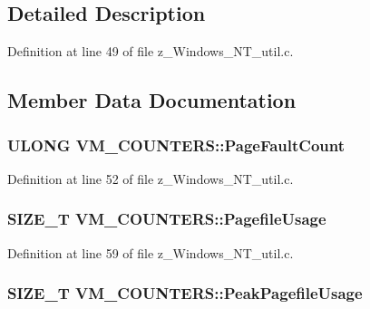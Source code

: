 \subsection{Detailed Description}


Definition at line 49 of file z\-\_\-\-Windows\-\_\-\-N\-T\-\_\-util.\-c.



\subsection{Member Data Documentation}
\hypertarget{structVM__COUNTERS_a2cc46c0341e51f5fd53025bdf0e5658c}{
\subsubsection[{Page\-Fault\-Count}]{\setlength{\rightskip}{0pt plus 5cm}U\-L\-O\-N\-G V\-M\-\_\-\-C\-O\-U\-N\-T\-E\-R\-S\-::\-Page\-Fault\-Count}}\label{structVM__COUNTERS_a2cc46c0341e51f5fd53025bdf0e5658c}


Definition at line 52 of file z\-\_\-\-Windows\-\_\-\-N\-T\-\_\-util.\-c.

\hypertarget{structVM__COUNTERS_a1ae3e46e1816321cadd686716c301e8a}{
\subsubsection[{Pagefile\-Usage}]{\setlength{\rightskip}{0pt plus 5cm}S\-I\-Z\-E\-\_\-\-T V\-M\-\_\-\-C\-O\-U\-N\-T\-E\-R\-S\-::\-Pagefile\-Usage}}\label{structVM__COUNTERS_a1ae3e46e1816321cadd686716c301e8a}


Definition at line 59 of file z\-\_\-\-Windows\-\_\-\-N\-T\-\_\-util.\-c.

\hypertarget{structVM__COUNTERS_ab30aac195648217a62055b4267aad106}{
\subsubsection[{Peak\-Pagefile\-Usage}]{\setlength{\rightskip}{0pt plus 5cm}S\-I\-Z\-E\-\_\-\-T V\-M\-\_\-\-C\-O\-U\-N\-T\-E\-R\-S\-::\-Peak\-Pagefile\-Usage}}\label{structVM__COUNTERS_ab30aac195648217a62055b4267aad106}


